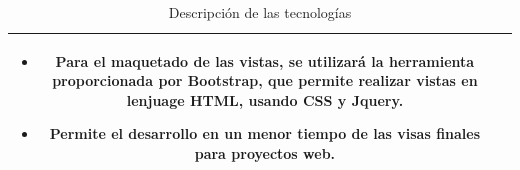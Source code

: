 \begin{table}[h]
\begin{center}
\begin{tabular}{ | c | p{10cm} | }
	    \begin{itemize}[topsep=0pt]
	      \item Para el maquetado de las vistas, se utilizará la herramienta proporcionada por Bootstrap, que permite realizar vistas en lenjuage HTML, usando CSS y Jquery. 
	      \item Permite el desarrollo en un menor tiempo de las visas finales para proyectos web.
	    \end{itemize} \\
	    \bottomrule
		\end{tabular}
  	\caption{Descripción de las tecnologías}
  	\label{Descripción de las tecnologías}
  	\end{center}
	\end{table}

